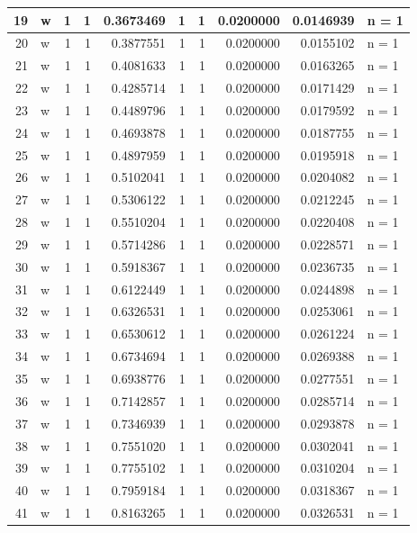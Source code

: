 \documentclass[
  letterpaper,
  DIV=11,
  numbers=noendperiod]{scrreprt}
\begin{document}
\begin{table}
\begin{tabular}[t]{r|l|r|r|r|r|r|r|r|l}
19 & w & 1 & 1 & 0.3673469 & 1 & 1 & 0.0200000 & 0.0146939 & n = 1\\
\hline
20 & w & 1 & 1 & 0.3877551 & 1 & 1 & 0.0200000 & 0.0155102 & n = 1\\
\hline
21 & w & 1 & 1 & 0.4081633 & 1 & 1 & 0.0200000 & 0.0163265 & n = 1\\
\hline
22 & w & 1 & 1 & 0.4285714 & 1 & 1 & 0.0200000 & 0.0171429 & n = 1\\
\hline
23 & w & 1 & 1 & 0.4489796 & 1 & 1 & 0.0200000 & 0.0179592 & n = 1\\
\hline
24 & w & 1 & 1 & 0.4693878 & 1 & 1 & 0.0200000 & 0.0187755 & n = 1\\
\hline
25 & w & 1 & 1 & 0.4897959 & 1 & 1 & 0.0200000 & 0.0195918 & n = 1\\
\hline
26 & w & 1 & 1 & 0.5102041 & 1 & 1 & 0.0200000 & 0.0204082 & n = 1\\
\hline
27 & w & 1 & 1 & 0.5306122 & 1 & 1 & 0.0200000 & 0.0212245 & n = 1\\
\hline
28 & w & 1 & 1 & 0.5510204 & 1 & 1 & 0.0200000 & 0.0220408 & n = 1\\
\hline
29 & w & 1 & 1 & 0.5714286 & 1 & 1 & 0.0200000 & 0.0228571 & n = 1\\
\hline
30 & w & 1 & 1 & 0.5918367 & 1 & 1 & 0.0200000 & 0.0236735 & n = 1\\
\hline
31 & w & 1 & 1 & 0.6122449 & 1 & 1 & 0.0200000 & 0.0244898 & n = 1\\
\hline
32 & w & 1 & 1 & 0.6326531 & 1 & 1 & 0.0200000 & 0.0253061 & n = 1\\
\hline
33 & w & 1 & 1 & 0.6530612 & 1 & 1 & 0.0200000 & 0.0261224 & n = 1\\
\hline
34 & w & 1 & 1 & 0.6734694 & 1 & 1 & 0.0200000 & 0.0269388 & n = 1\\
\hline
35 & w & 1 & 1 & 0.6938776 & 1 & 1 & 0.0200000 & 0.0277551 & n = 1\\
\hline
36 & w & 1 & 1 & 0.7142857 & 1 & 1 & 0.0200000 & 0.0285714 & n = 1\\
\hline
37 & w & 1 & 1 & 0.7346939 & 1 & 1 & 0.0200000 & 0.0293878 & n = 1\\
\hline
38 & w & 1 & 1 & 0.7551020 & 1 & 1 & 0.0200000 & 0.0302041 & n = 1\\
\hline
39 & w & 1 & 1 & 0.7755102 & 1 & 1 & 0.0200000 & 0.0310204 & n = 1\\
\hline
40 & w & 1 & 1 & 0.7959184 & 1 & 1 & 0.0200000 & 0.0318367 & n = 1\\
\hline
41 & w & 1 & 1 & 0.8163265 & 1 & 1 & 0.0200000 & 0.0326531 & n = 1\\

\end{tabular}
\end{table}
\end{document}
